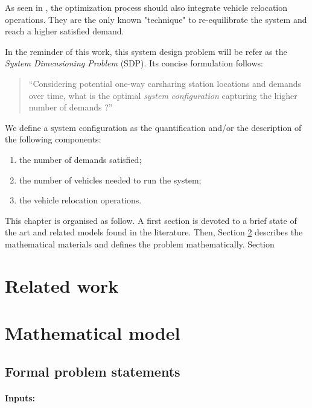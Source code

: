 \begin{bibunit}[ieeetr]
As seen in \cite{les_relocs_sont_importantes_et_necessaires}, the optimization process should also integrate vehicle relocation operations.
They are the only known "technique" to re-equilibrate the system and reach a higher satisfied demand.

In the reminder of this work, this system design problem will be refer as the \emph{System Dimensioning Problem} (SDP).
Its concise formulation follows:
\begin{quote}
``Considering potential one-way carsharing station locations and demands over time, what is the optimal \emph{system configuration} capturing the higher number of demands ?''
\end{quote}

We define a system configuration as the quantification and/or the description of the following components:
\begin{enumerate}
\item the number of demands satisfied;
\item the number of vehicles needed to run the system;
\item the vehicle relocation operations.
\end{enumerate}

This chapter is organised as follow.
A first section is devoted to a brief state of the art and related models found in the literature.
Then, Section \ref{sec:mathModel} describes the mathematical materials and defines the problem mathematically.
Section 


\newpage
\section{Related work}


\newpage
\section{Mathematical model} \label{sec:mathModel}
\subsection{Formal problem statements}
\paragraph{Inputs:}


\end{bibunit}
